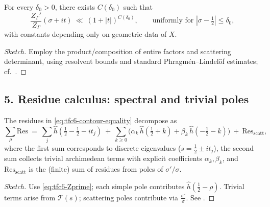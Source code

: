 \begin{lemma}\relax\hspace{0pt}
\label{lem:tfc6-vertical}\relax\hspace{0pt}
For every $\delta_0>0$, there exists $C(\delta_0)$ such that
\[
\frac{Z_\Gamma'}{Z_\Gamma}(\sigma+it)\ \ll\ (1+|t|)^{C(\delta_0)},\qquad \text{uniformly for }|\sigma-\tfrac12|\le \delta_0,
\]
with constants depending only on geometric data of $X$. \relax\hspace{0pt}
\end{lemma}

\begin{proof}[Sketch]\relax\hspace{0pt}
Employ the product/composition of entire factors and scattering determinant, using resolvent bounds and standard Phragmén--Lindelöf estimates; cf.\ \cite{Borthwick,GuillopeZworski}. \relax\hspace{0pt}
\end{proof}

\subsection*{5. Residue calculus: spectral and trivial poles}\relax\hspace{0pt}
\label{subsec:tfc6-residues} %

\begin{proposition}\relax\hspace{0pt}
\label{prop:tfc6-res}\relax\hspace{0pt}
The residues in \eqref{eq:tfc6-contour-equality} decompose as
\[
\sum_{\rho}\mathrm{Res}\ =\ \sum_{j}\widehat{h}\!\left(\tfrac12-\tfrac12-it_j\right)\ +\ \sum_{k\ge 0}\Big(\alpha_k\,\widehat{h}(\tfrac12+k)+\beta_k\,\widehat{h}(-\tfrac12-k)\Big)\ +\ \mathrm{Res}_{\text{scatt}},
\]
where the first sum corresponds to discrete eigenvalues ($s=\tfrac12\pm it_j$), the second sum collects trivial archimedean terms with explicit coefficients $\alpha_k,\beta_k$, and $\mathrm{Res}_{\text{scatt}}$ is the (finite) sum of residues from poles of $\sigma'/\sigma$. \relax\hspace{0pt}
\end{proposition}

\begin{proof}[Sketch]\relax\hspace{0pt}
Use \eqref{eq:tfc6-Zprime}; each simple pole contributes $\widehat{h}(\tfrac12-\rho)$. Trivial terms arise from $\mathcal{T}(s)$; scattering poles contribute via $\frac{\sigma'}{\sigma}$. See \cite{HejhalII}. \relax\hspace{0pt}
\end{proof}

